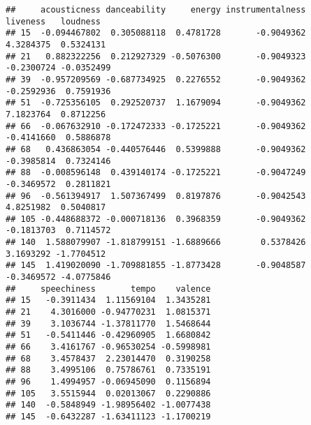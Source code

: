 \documentclass[
]{article}
\newenvironment{Shaded}{\begin{snugshade}}{\end{snugshade}}
\newcommand{\CommentTok}[1]{\textcolor[rgb]{0.56,0.35,0.01}{\textit{#1}}}
\newcommand{\KeywordTok}[1]{\textcolor[rgb]{0.13,0.29,0.53}{\textbf{#1}}}
\newcommand{\NormalTok}[1]{#1}
\newcommand{\OperatorTok}[1]{\textcolor[rgb]{0.81,0.36,0.00}{\textbf{#1}}}
\newcommand{\StringTok}[1]{\textcolor[rgb]{0.31,0.60,0.02}{#1}}
\begin{document}
\begin{Shaded}
\end{Shaded}

\begin{verbatim}
##     acousticness danceability     energy instrumentalness   liveness   loudness
## 15  -0.094467802  0.305088118  0.4781728       -0.9049362  4.3284375  0.5324131
## 21   0.882322256  0.212927329 -0.5076300       -0.9049323 -0.2300724 -0.0352499
## 39  -0.957209569 -0.687734925  0.2276552       -0.9049362 -0.2592936  0.7591936
## 51  -0.725356105  0.292520737  1.1679094       -0.9049362  7.1823764  0.8712256
## 66  -0.067632910 -0.172472333 -0.1725221       -0.9049362 -0.4141660  0.5886878
## 68   0.436863054 -0.440576446  0.5399888       -0.9049362 -0.3985814  0.7324146
## 88  -0.008596148  0.439140174 -0.1725221       -0.9047249 -0.3469572  0.2811821
## 96  -0.561394917  1.507367499  0.8197876       -0.9042543  4.8251982  0.5040817
## 105 -0.448688372 -0.000718136  0.3968359       -0.9049362 -0.1813703  0.7114572
## 140  1.588079907 -1.818799151 -1.6889666        0.5378426  3.1693292 -1.7704512
## 145  1.419020090 -1.709881855 -1.8773428       -0.9048587 -0.3469572 -4.0775846
##     speechiness       tempo    valence
## 15   -0.3911434  1.11569104  1.3435281
## 21    4.3016000 -0.94770231  1.0815371
## 39    3.1036744 -1.37811770  1.5468644
## 51   -0.5411446 -0.42960905  1.6680842
## 66    3.4161767 -0.96530254 -0.5998981
## 68    3.4578437  2.23014470  0.3190258
## 88    3.4995106  0.75786761  0.7335191
## 96    1.4994957 -0.06945090  0.1156894
## 105   3.5515944  0.02013067  0.2290886
## 140  -0.5848949 -1.98956402 -1.0077438
## 145  -0.6432287 -1.63411123 -1.1700219
\end{verbatim}

\begin{Shaded}
\end{Shaded}
\end{document}
